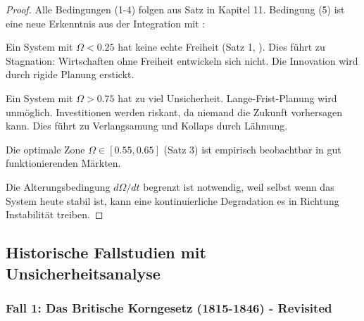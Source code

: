\documentclass[a4paper, 12pt, twoside, openright]{report}
\theoremstyle{definition}
\theoremstyle{definition}
\begin{document}
\begin{proof}

Alle Bedingungen (1-4) folgen aus Satz in Kapitel 11. Bedingung (5) ist eine neue Erkenntnis aus der Integration mit \cite{epp_signal}:

Ein System mit $\Omega < 0.25$ hat keine echte Freiheit (Satz 1, \cite{epp_signal}). Dies führt zu Stagnation: Wirtschaften ohne Freiheit entwickeln sich nicht. Die Innovation wird durch rigide Planung erstickt.

Ein System mit $\Omega > 0.75$ hat zu viel Unsicherheit. Lange-Frist-Planung wird unmöglich. Investitionen werden riskant, da niemand die Zukunft vorhersagen kann. Dies führt zu Verlangsamung und Kollaps durch Lähmung.

Die optimale Zone $\Omega \in [0.55, 0.65]$ (Satz 3) ist empirisch beobachtbar in gut funktionierenden Märkten.

Die Alterungsbedingung $d\Omega/dt$ begrenzt ist notwendig, weil selbst wenn das System heute stabil ist, kann eine kontinuierliche Degradation es in Richtung Instabilität treiben.

\end{proof}

\subsection{Historische Fallstudien mit Unsicherheitsanalyse}

\subsubsection{Fall 1: Das Britische Korngesetz (1815-1846) - Revisited}
\end{document}
